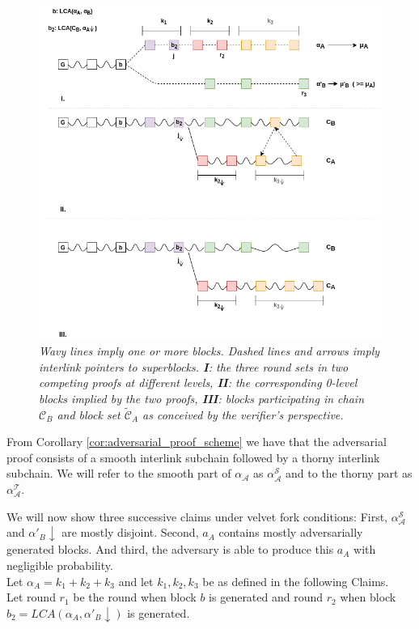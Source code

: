 \begin{figure}[h!]
	\begin{center}
		\includegraphics[scale=0.5]{figures/proof_velvet.png}
	\end{center}
	\caption{\textit{ Wavy lines imply one or more blocks. Dashed lines and arrows imply
	interlink pointers to superblocks. \textbf{I}: the three round sets in two competing
	proofs at different levels, \textbf{II}: the corresponding 0-level blocks implied by the two proofs,
	\textbf{III}: blocks participating in chain $\mathcal{C}_B$ and block set $\widetilde{\mathcal{C}}_A$ as conceived by the verifier's perspective.}}	
    \label{fig:proof_velvet}
\end{figure}

From Corollary \ref{cor:adversarial_proof_scheme} we have that the adversarial proof 
consists of a smooth interlink subchain followed by a thorny interlink subchain. We will refer to the smooth part of $\alpha_\mathcal{A}$ as $\alpha^{\mathcal{S}}_\mathcal{A}$ and to the thorny part as $\alpha^{\mathcal{T}}_\mathcal{A}$.   

We will now show three successive claims under velvet fork conditions: First,
$\alpha^{\mathcal{S}}_\mathcal{A}$ and $\alpha'_B \downarrow$ are mostly
disjoint. Second, $a_A$ contains mostly adversarially generated blocks. And third,
the adversary is able to produce this $a_A$ with negligible probability.\\
Let $\alpha_A = k_1 + k_2 + k_3$ and let $k_1, k_2, k_3$ be as defined in the
following Claims.\\
Let round $r_1$ be the round when block $b$ is generated and round $r_2$ when block
$b_2 = LCA(\alpha_A, \alpha'_B\downarrow)$ is generated.\\

